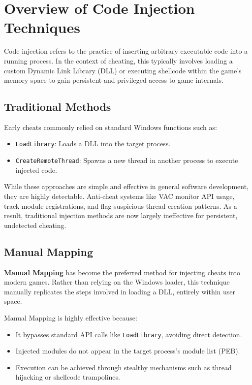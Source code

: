 \section{Overview of Code Injection Techniques}

Code injection refers to the practice of inserting arbitrary executable code into a running process. In the context of cheating, this typically involves loading a custom Dynamic Link Library (DLL) or executing shellcode within the game's memory space to gain persistent and privileged access to game internals.

\subsection*{Traditional Methods}

Early cheats commonly relied on standard Windows functions such as:

\begin{itemize}
    \item \texttt{LoadLibrary}: Loads a DLL into the target process.
    \item \texttt{CreateRemoteThread}: Spawns a new thread in another process to execute injected code.
\end{itemize}

While these approaches are simple and effective in general software development, they are highly detectable. Anti-cheat systems like VAC monitor API usage, track module registrations, and flag suspicious thread creation patterns. As a result, traditional injection methods are now largely ineffective for persistent, undetected cheating.

\subsection*{Manual Mapping}

\textbf{Manual Mapping} has become the preferred method for injecting cheats into modern games. Rather than relying on the Windows loader, this technique manually replicates the steps involved in loading a DLL, entirely within user space.

Manual Mapping is highly effective because:

\begin{itemize}
    \item It bypasses standard API calls like \texttt{LoadLibrary}, avoiding direct detection.
    \item Injected modules do not appear in the target process’s module list (PEB).
    \item Execution can be achieved through stealthy mechanisms such as thread hijacking or shellcode trampolines.
\end{itemize}

